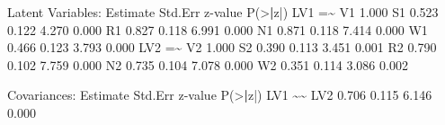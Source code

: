 \documentclass[
]{article}
\newenvironment{Shaded}{\begin{snugshade}}{\end{snugshade}}
\newcommand{\ErrorTok}[1]{\textcolor[rgb]{0.64,0.00,0.00}{\textbf{#1}}}
\newcommand{\FloatTok}[1]{\textcolor[rgb]{0.00,0.00,0.81}{#1}}
\newcommand{\FunctionTok}[1]{\textcolor[rgb]{0.00,0.00,0.00}{#1}}
\newcommand{\NormalTok}[1]{#1}
\newcommand{\OtherTok}[1]{\textcolor[rgb]{0.56,0.35,0.01}{#1}}
\newcommand{\SpecialCharTok}[1]{\textcolor[rgb]{0.00,0.00,0.00}{#1}}
\begin{document}
\begin{Shaded}
\begin{Highlighting}[]
\NormalTok{Latent Variables}\SpecialCharTok{:}
\NormalTok{                   Estimate  Std.Err  z}\SpecialCharTok{{-}}\NormalTok{value  }\FunctionTok{P}\NormalTok{(}\SpecialCharTok{\textgreater{}}\ErrorTok{|}\NormalTok{z}\SpecialCharTok{|}\NormalTok{)}
\NormalTok{  LV1 }\OtherTok{=}\ErrorTok{\textasciitilde{}}                                              
\NormalTok{    V1                }\FloatTok{1.000}                           
\NormalTok{    S1                }\FloatTok{0.523}    \FloatTok{0.122}    \FloatTok{4.270}    \FloatTok{0.000}
\NormalTok{    R1                }\FloatTok{0.827}    \FloatTok{0.118}    \FloatTok{6.991}    \FloatTok{0.000}
\NormalTok{    N1                }\FloatTok{0.871}    \FloatTok{0.118}    \FloatTok{7.414}    \FloatTok{0.000}
\NormalTok{    W1                }\FloatTok{0.466}    \FloatTok{0.123}    \FloatTok{3.793}    \FloatTok{0.000}
\NormalTok{  LV2 }\OtherTok{=}\ErrorTok{\textasciitilde{}}                                              
\NormalTok{    V2                }\FloatTok{1.000}                           
\NormalTok{    S2                }\FloatTok{0.390}    \FloatTok{0.113}    \FloatTok{3.451}    \FloatTok{0.001}
\NormalTok{    R2                }\FloatTok{0.790}    \FloatTok{0.102}    \FloatTok{7.759}    \FloatTok{0.000}
\NormalTok{    N2                }\FloatTok{0.735}    \FloatTok{0.104}    \FloatTok{7.078}    \FloatTok{0.000}
\NormalTok{    W2                }\FloatTok{0.351}    \FloatTok{0.114}    \FloatTok{3.086}    \FloatTok{0.002}

\NormalTok{Covariances}\SpecialCharTok{:}
\NormalTok{                   Estimate  Std.Err  z}\SpecialCharTok{{-}}\NormalTok{value  }\FunctionTok{P}\NormalTok{(}\SpecialCharTok{\textgreater{}}\ErrorTok{|}\NormalTok{z}\SpecialCharTok{|}\NormalTok{)}
\NormalTok{  LV1 }\SpecialCharTok{\textasciitilde{}}\ErrorTok{\textasciitilde{}}                                              
\NormalTok{    LV2               }\FloatTok{0.706}    \FloatTok{0.115}    \FloatTok{6.146}    \FloatTok{0.000}


\end{Highlighting}
\end{Shaded}
\end{document}
